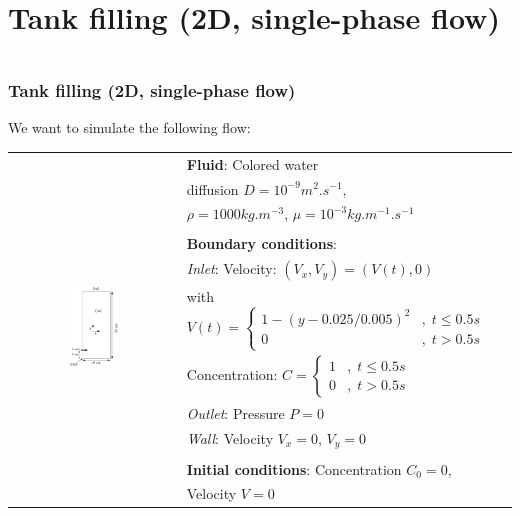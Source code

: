 \documentclass[10pt, hyperref={unicode=true,pdfusetitle, bookmarks=true,bookmarksnumbered=false,bookmarksopen=false, breaklinks=false,pdfborder={0 0 1},backref=true,colorlinks=true,linkcolor=darkblue,pageanchor}]{beamer}
\begin{document}
\section{{\bf{Tank filling (2D, single-phase flow)}}}
\begin{frame}
\begin{columns}[c] 
\tableofcontents[sections={1-9},currentsection, currentsubsection]
\tableofcontents[sections={10-16},currentsection, currentsubsection]
\end{columns}
\end{frame}
\begin{frame}
\frametitle{Tank filling (2D, single-phase flow)}
\begin{block}{We want to simulate the following flow:}

\begin{tabular}{cl}
\multirow{14}{*}{\includegraphics[width=0.3\textwidth]{PICTURES/tank2D.pdf}} & \textbf{Fluid}: Colored water \tabularnewline
 & diffusion $D=10^{-9}m^{2}.s^{-1}$, \tabularnewline
 & $\rho=1000kg.m^{-3}$, $\mu=10^{-3}kg.m^{-1}.s^{-1}$\tabularnewline

 & \tabularnewline

 & \textbf{Boundary conditions}:\tabularnewline

 & \textit{Inlet}: Velocity: $(V_{x},V_{y})=(V(t),0)$  \tabularnewline
 & with $V(t)=
    \begin{cases}
    1-(y-0.025/0.005)^{2} & ,\; t\leq0.5s\\
    0 & ,\; t>0.5s
    \end{cases}$ \tabularnewline

 & Concentration: $C=
    \begin{cases} 
    1 & ,\; t\leq0.5s\\
    0 & ,\; t>0.5s
    \end{cases}$ \tabularnewline
 & \textit{Outlet}: Pressure $P=0$\tabularnewline
 & \textit{Wall}: Velocity $V_{x}=0$, $V_{y}=0$ \tabularnewline

 & \tabularnewline

 & \textbf{Initial conditions}: Concentration $C_0=0$, \tabularnewline
 & Velocity $V=0$ \tabularnewline
\end{tabular}

\end{block}
\end{frame}
\end{document}
